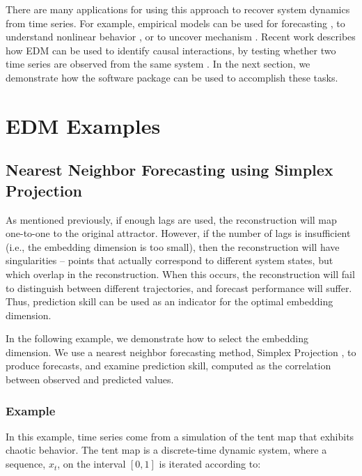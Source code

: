 \documentclass[article]{jss}
\begin{document}
There are many applications for using this approach to recover system dynamics from time series. For example, empirical models can be used for forecasting \citep{Sugihara_1990}, to understand nonlinear behavior \citep{Sugihara_1994}, or to uncover mechanism \citep{Dixon_1999}. Recent work describes how EDM can be used to identify causal interactions, by testing whether two time series are observed from the same system \citep{Sugihara_2012}. In the next section, we demonstrate how the  software package can be used to accomplish these tasks.

\section{EDM Examples}\label{sec:EDM-examples}

\subsection{Nearest Neighbor Forecasting using Simplex Projection}\label{sec:nearest-neighbor-forecasting}

As mentioned previously, if enough lags are used, the reconstruction will map one-to-one to the original attractor. However, if the number of lags is insufficient (i.e., the embedding dimension is too small), then the reconstruction will have singularities -- points that actually correspond to different system states, but which overlap in the reconstruction. When this occurs, the reconstruction will fail to distinguish between different trajectories, and forecast performance will suffer. Thus, prediction skill can be used as an indicator for the optimal embedding dimension.

In the following example, we demonstrate how to select the embedding dimension. We use a nearest neighbor forecasting method, Simplex Projection \citep{Sugihara_1990}, to produce forecasts, and examine prediction skill, computed as the correlation between observed and predicted values.

\subsubsection{Example}\label{sec:simplex-example}

In this example, time series come from a simulation of the tent map that exhibits chaotic behavior. The tent map is a discrete-time dynamic system, where a sequence, $x_t$, on the interval $[0, 1]$ is iterated according to:
\end{document}
